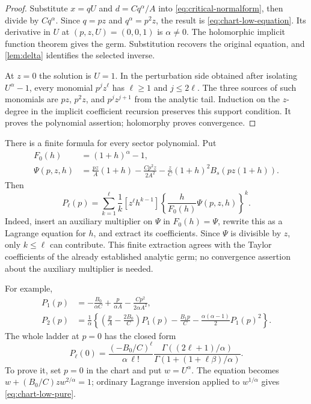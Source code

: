\begin{proof}
Substitute $x=qU$ and $d=Cq^\alpha/A$ into
\eqref{eq:critical-normalform}, then divide by $Cq^\alpha$.
Since $q=pz$ and $q^\alpha=p^2z$, the result is
\eqref{eq:chart-low-equation}.  Its derivative in $U$ at
$(p,z,U)=(0,0,1)$ is $\alpha\ne0$.  The holomorphic implicit
function theorem gives the germ.  Substitution recovers the original
equation, and \cref{lem:delta} identifies the selected inverse.

At $z=0$ the solution is $U=1$.  In the perturbation side obtained
after isolating $U^\alpha-1$, every monomial $p^jz^\ell$ has
$\ell\ge1$ and $j\le2\ell$.  The three sources of such monomials
are $pz$, $p^2z$, and $p^jz^{j+1}$ from the analytic tail.
Induction on the $z$-degree in the implicit coefficient recursion
preserves this support condition.  It proves the polynomial assertion;
holomorphy proves convergence.
\end{proof}

There is a finite formula for every sector polynomial.  Put
\begin{align*}
 F_0(h)&=(1+h)^\alpha-1,\\
 \Psi(p,z,h)&=\frac{pz}{A}(1+h)-\frac{Cp^2z}{2A^2}
 -\frac zC(1+h)^2B_s(pz(1+h)).
\end{align*}
Then
\begin{equation}\label{eq:chart-low-finite}
 P_\ell(p)=\sum_{k=1}^{\ell}\frac1k
 [z^\ell h^{k-1}]
 \left\{\frac h{F_0(h)}\Psi(p,z,h)\right\}^{k}.
\end{equation}
Indeed, insert an auxiliary multiplier on $\Psi$ in $F_0(h)=\Psi$,
rewrite this as a Lagrange equation for $h$, and extract its coefficients.
Since $\Psi$ is divisible by $z$, only $k\le\ell$ can contribute.
This finite extraction agrees with the Taylor coefficients of the
already established analytic germ; no convergence assertion about the
auxiliary multiplier is needed.

For example,
\begin{align}
 P_1(p)&=-\frac{B_0}{\alpha C}+
          \frac p{\alpha A}-\frac{Cp^2}{2\alpha A^2},
          \label{eq:chart-low-P1}\\
 P_2(p)&=\frac1\alpha\left\{
 \left(\frac pA-\frac{2B_0}C\right)P_1(p)-\frac{B_1p}C
 -\frac{\alpha(\alpha-1)}2P_1(p)^2\right\}.
          \label{eq:chart-low-P2}
\end{align}
The whole ladder at $p=0$ has the closed form
\begin{equation}\label{eq:chart-low-pure}
 P_\ell(0)=
 \frac{(-B_0/C)^\ell}{\alpha\,\ell!}
 \frac{\Gamma((2\ell+1)/\alpha)}
 {\Gamma(1+(1+\ell\beta)/\alpha)}.
\end{equation}
To prove it, set $p=0$ in the chart and put $w=U^\alpha$.
The equation becomes $w+(B_0/C)zw^{2/\alpha}=1$;
ordinary Lagrange inversion applied to $w^{1/\alpha}$ gives
\eqref{eq:chart-low-pure}.

